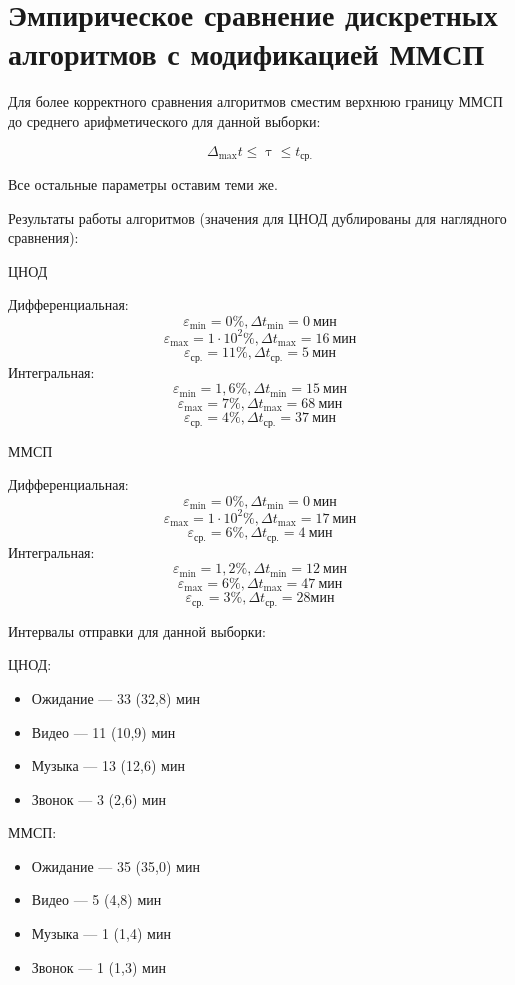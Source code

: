 \documentclass[12pt]{report}
\let\tau\uptau
\let\eps\varepsilon
\begin{document}
\section{Эмпирическое сравнение дискретных алгоритмов с модификацией ММСП}
Для более корректного сравнения алгоритмов сместим верхнюю границу ММСП до среднего арифметического для данной выборки:

$$\Delta_{\max} t \le \tau \le t_{\text{ср.}}$$

Все остальные параметры оставим теми же.

Результаты работы алгоритмов (значения для ЦНОД дублированы для наглядного сравнения):

\begin{minipage}[b]{0.45\textwidth}
    \centering ЦНОД

    Дифференциальная:
        $$\eps_{\min}=0\%, \Delta t_{\min}=0\ \text{мин}$$
        $$\eps_{\max}=1\cdot 10^2\%, \Delta t_{\max}=16\ \text{мин}$$
        $$\eps_{\text{ср.}}=11\%, \Delta t_{\text{ср.}}=5\ \text{мин}$$
    Интегральная:
        $$\eps_{\min}=1,6\%, \Delta t_{\min}=15\ \text{мин}$$
        $$\eps_{\max}=7\%, \Delta t_{\max}=68\ \text{мин}$$
        $$\eps_{\text{ср.}}=4\%, \Delta t_{\text{ср.}}=37\ \text{мин}$$
\end{minipage}
\hfill
\begin{minipage}[b]{0.45\textwidth}
    \centering ММСП

    Дифференциальная:
    $$\eps_{\min}=0\%, \Delta t_{\min}=0\ \text{мин}$$
    $$\eps_{\max}=1\cdot 10^2\%, \Delta t_{\max}=17\ \text{мин}$$
    $$\eps_{\text{ср.}}=6\%, \Delta t_{\text{ср.}}=4\ \text{мин}$$
    Интегральная:
    $$\eps_{\min}=1,2\%, \Delta t_{\min}=12\ \text{мин}$$
    $$\eps_{\max}=6\%, \Delta t_{\max}=47\ \text{мин}$$
    $$\eps_{\text{ср.}}=3\%, \Delta t_{\text{ср.}}=28 \text{мин}$$
\end{minipage}

\vspace{0.5cm}
Интервалы отправки для данной выборки:
\vspace{0.5cm}

\begin{minipage}[b]{0.45\textwidth}
    \centering ЦНОД:
    \begin{itemize}
        \item Ожидание — 33 (32,8) мин
        \item Видео — 11 (10,9) мин
        \item Музыка — 13 (12,6) мин
        \item Звонок — 3 (2,6) мин
    \end{itemize}\end{minipage}
\hfill
\begin{minipage}[b]{0.45\textwidth}
    \centering ММСП:
    \begin{itemize}
        \item Ожидание — 35 (35,0) мин
        \item Видео — 5 (4,8) мин
        \item Музыка — 1 (1,4) мин
        \item Звонок — 1 (1,3) мин
    \end{itemize}
\end{minipage}
\end{document}

